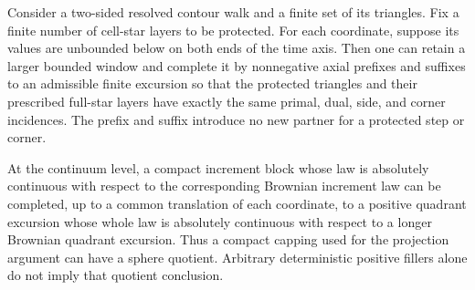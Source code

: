 \begin{lemma}
\label{bg:protected-capping}
Consider a two-sided resolved contour walk and a finite set of its
triangles. Fix a finite number of cell-star layers to be protected.
For each coordinate, suppose its values are unbounded below on both
ends of the time axis. Then one can retain a larger
bounded window and complete it by nonnegative axial prefixes and
suffixes to an admissible finite excursion so that the protected
triangles and their prescribed full-star layers have exactly the
same primal, dual, side, and corner incidences. The prefix and suffix
introduce no new partner for a protected step or corner.

At the continuum level, a compact increment block whose law is
absolutely continuous with respect to the corresponding Brownian
increment law can be completed, up to a common translation of each
coordinate, to a positive quadrant excursion whose whole law is
absolutely continuous with respect to a longer Brownian quadrant
excursion. Thus a compact capping used for the projection argument
can have a sphere quotient. Arbitrary deterministic positive fillers
alone do not imply that quotient conclusion.
\end{lemma}

